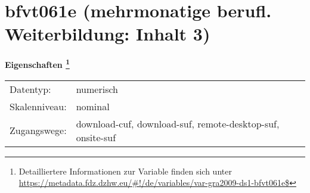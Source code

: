 
    \setcounter{footnote}{0}

    \vspace*{-1.8cm}
	\section{bfvt061e (mehrmonatige berufl. Weiterbildung: Inhalt 3)}
	\label{section:bfvt061e}



    \vspace*{0.5cm}
    \noindent\textbf{Eigenschaften
	\footnote{Detailliertere Informationen zur Variable finden sich unter
		\url{https://metadata.fdz.dzhw.eu/\#!/de/variables/var-gra2009-ds1-bfvt061e$}}}\\
	\begin{tabularx}{\hsize}{@{}lX}
	Datentyp: & numerisch \\
	Skalenniveau: & nominal \\
	Zugangswege: &
	  download-cuf, 
	  download-suf, 
	  remote-desktop-suf, 
	  onsite-suf
 \\
    \end{tabularx}




